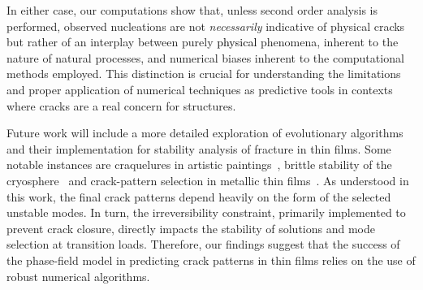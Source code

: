 \documentclass[10pt]{article}
\begin{document}
In either case, our computations show that, unless second order analysis is performed, observed nucleations are not \emph{necessarily} indicative of physical cracks but rather of an interplay between purely   \textcolor{black}{physical} phenomena, inherent to the nature of natural processes, and numerical biases inherent to the computational methods employed. This distinction is crucial for understanding the limitations and proper application of numerical techniques as predictive tools in contexts where cracks are a real concern for structures.


Future work will include a more detailed exploration of evolutionary algorithms and their implementation for stability analysis of fracture in thin films. Some notable instances are craquelures in artistic paintings~\cite{fuster-lopez:2020-picassos, Bosco:2020aa,Bosco:2021},  brittle stability of the cryosphere~\cite{weiss:2017-linking, tollefson:2017-giant, Sun:2023aa, Millan:2023aa} and crack-pattern selection in metallic thin films~\cite{Faurie2019-to}. {As understood in this work, the final crack patterns depend heavily on the form of the selected unstable modes. In turn, the irreversibility constraint, primarily implemented to prevent crack closure, directly impacts the stability of solutions and mode selection at transition loads. Therefore, our findings suggest that the success of the phase-field model in predicting crack patterns in thin films relies on the use of robust numerical algorithms.}

%



 

\printbibliography %

%
%
\end{document}
